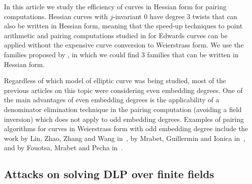 In this article we study the efficiency of curves in Hessian form for pairing computations. 
Hessian curves with $j$-invariant 0 have degree 3 twists that can also be written in Hessian form, meaning that the speed-up techniques to point arithmetic and pairing computations studied in \cite{2014/LWZ} for Edwards curves can be applied
without the expensive curve conversion to Weierstrass form.
We use the families proposed by \cite{2010/freeman}, in which we could find
3 families that can be written in Hessian form.

Regardless of which model of elliptic curve was being studied,
most of the previous articles on this topic were considering even embedding degrees.
One of the main advantages of even embedding degrees is the applicability of a denominator elimination technique in the pairing computation 
(avoiding a field inversion)
which does not apply to odd embedding degrees.
Examples of pairing algorithms for curves in Weierstrass form with odd embedding degree include
the work by Lin, Zhao, Zhang and Wang in~\cite{2008/lin}, by Mrabet, Guillermin and Ionica in~\cite{2009/deg15},
and by Fouotsa, Mrabet and Pecha in~\cite{2016/degodd}.

\subsection{Attacks on solving DLP over finite fields}

